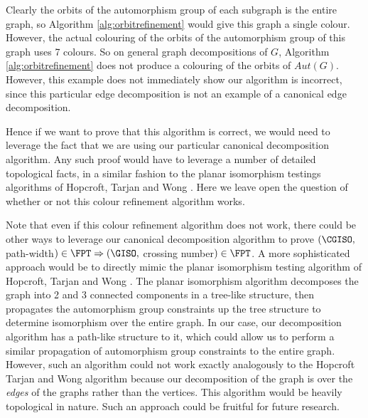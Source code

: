 \documentclass[11pt]{report}
\begin{document}
Clearly the orbits of the automorphism group of each subgraph is the entire graph, so Algorithm \ref{alg:orbitrefinement} would give this graph a single colour. However, the actual colouring of the orbits of the automorphism group of this graph uses 7 colours. So on general graph decompositions of $G$, Algorithm \ref{alg:orbitrefinement} does not produce a colouring of the orbits of $Aut(G)$. However, this example does not immediately show our algorithm is incorrect, since this particular edge decomposition is not an example of a canonical edge decomposition.

Hence if we want to prove that this algorithm is correct, we would need to leverage the fact that we are using our particular canonical decomposition algorithm. Any such proof would have to leverage a number of detailed topological facts, in a similar fashion to the planar isomorphism testings algorithms of Hopcroft, Tarjan and Wong \cite{HopcroftTarjan72} \cite{HopcroftWong74}. Here we leave open the question of whether or not this colour refinement algorithm works. 

Note that even if this colour refinement algorithm does not work, there could be other ways to leverage our canonical decomposition algorithm to prove $(\CGISO,$ path-width$)\in \FPT \Rightarrow (\GISO,$ crossing number$)\in \FPT$. A more sophisticated approach would be to directly mimic the planar isomorphism testing algorithm of Hopcroft, Tarjan and Wong \cite{HopcroftTarjan72} \cite{HopcroftWong74}. The planar isomorphism algorithm decomposes the graph into 2 and 3 connected components in a tree-like structure, then propagates the automorphism group constraints up the tree structure to determine isomorphism over the entire graph. In our case, our decomposition algorithm has a path-like structure to it, which could allow us to perform a similar propagation of automorphism group constraints to the entire graph. However, such an algorithm could not work exactly analogously to the Hopcroft Tarjan and Wong algorithm because our decomposition of the graph is over the \emph{edges} of the graphs rather than the vertices. This algorithm would be heavily topological in nature. Such an approach could be fruitful for future research.
\end{document}
